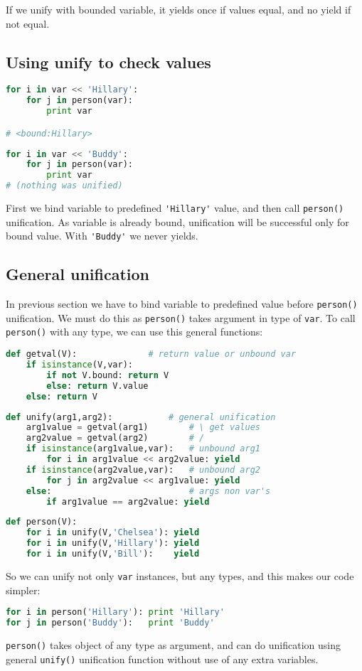 If we unify with bounded variable, it yields once if values equal,
and no yield if not equal.

\subsection{Using unify to check values}

\begin{lstlisting}[language=Python]
for i in var << 'Hillary':
	for j in person(var):
		print var

# <bound:Hillary>
\end{lstlisting}
\begin{lstlisting}[language=Python]
for i in var << 'Buddy':
	for j in person(var):
		print var
# (nothing was unified)
\end{lstlisting}
First we bind variable to predefined \verb|'Hillary'| value, and then 
call \verb|person()| unification. As variable is already bound, unification
will be successful only for bound value. With \verb|'Buddy'| we never yields.

\subsection{General unification}

In previous section we have to bind variable to predefined value before
\verb|person()| unification. We must do this as \verb|person()| takes argument
in type of \verb|var|. To call \verb|person()| with any type, we can use
this general functions:

\begin{lstlisting}[language=Python]
def getval(V):				# return value or unbound var
	if isinstance(V,var):
		if not V.bound: return V
		else: return V.value
	else: return V
\end{lstlisting}
\begin{lstlisting}[language=Python]
def unify(arg1,arg2):			# general unification
	arg1value = getval(arg1)		# \ get values
	arg2value = getval(arg2)		# /
	if isinstance(arg1value,var):	# unbound arg1
		for i in arg1value << arg2value: yield
	if isinstance(arg2value,var):	# unbound arg2
		for j in arg2value << arg1value: yield
	else:							# args non var's
		if arg1value == arg2value: yield
\end{lstlisting}
\begin{lstlisting}[language=Python]
def person(V):
	for i in unify(V,'Chelsea'): yield
	for i in unify(V,'Hillary'): yield
	for i in unify(V,'Bill'):    yield
\end{lstlisting}
So we can unify not only \verb|var| instances, but any types, and this
makes our code simpler:
\begin{lstlisting}[language=Python]
for i in person('Hillary'): print 'Hillary'
for j in person('Buddy'):   print 'Buddy'
\end{lstlisting}
\verb|person()| takes object of any type as argument, and can do unification 
using general \verb|unify()| unification function without use of any extra
variables.

